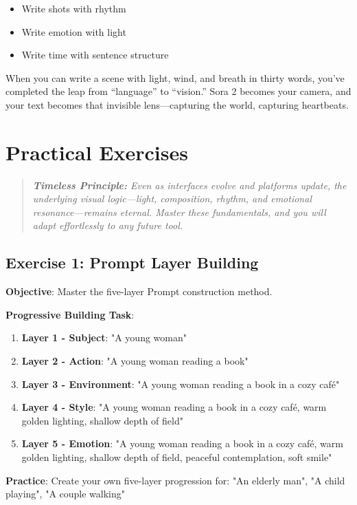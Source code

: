 \begin{itemize}
\item Write shots with rhythm
\item Write emotion with light
\item Write time with sentence structure
\end{itemize}

When you can write a scene with light, wind, and breath in thirty words, you've completed the leap from ``language'' to ``vision.'' Sora 2 becomes your camera, and your text becomes that invisible lens---capturing the world, capturing heartbeats.

\section*{Practical Exercises}

\begin{quote}
\textit{\textbf{Timeless Principle:} Even as interfaces evolve and platforms update, the underlying visual logic---light, composition, rhythm, and emotional resonance---remains eternal. Master these fundamentals, and you will adapt effortlessly to any future tool.}
\end{quote}

\subsection*{Exercise 1: Prompt Layer Building}
\textbf{Objective}: Master the five-layer Prompt construction method.

\textbf{Progressive Building Task}:
\begin{enumerate}
\item \textbf{Layer 1 - Subject}: "A young woman"
\item \textbf{Layer 2 - Action}: "A young woman reading a book"
\item \textbf{Layer 3 - Environment}: "A young woman reading a book in a cozy café"
\item \textbf{Layer 4 - Style}: "A young woman reading a book in a cozy café, warm golden lighting, shallow depth of field"
\item \textbf{Layer 5 - Emotion}: "A young woman reading a book in a cozy café, warm golden lighting, shallow depth of field, peaceful contemplation, soft smile"
\end{enumerate}

\textbf{Practice}: Create your own five-layer progression for: "An elderly man", "A child playing", "A couple walking"

